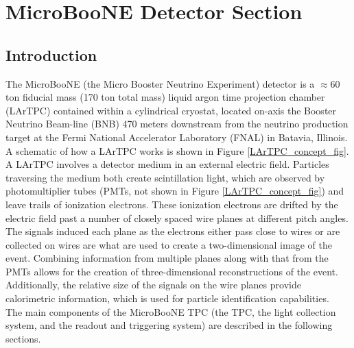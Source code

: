 
\section{MicroBooNE Detector Section}\label{UBDetectorSection}

\subsection{Introduction}
The MicroBooNE (the Micro Booster Neutrino Experiment) detector \cite{UBDetectorPaper} is a $\approx$60 ton fiducial mass (170 ton total mass) liquid argon time projection chamber (LArTPC) contained within a cylindrical cryostat, located on-axis the Booster Neutrino Beam-line (BNB) 470 meters downstream from the neutrino production target at the Fermi National Accelerator Laboratory (FNAL) in Batavia, Illinois. A schematic of how a LArTPC works is shown in Figure \ref{LArTPC_concept_fig}. A LArTPC involves a detector medium in an external electric field. Particles traversing the medium both create scintillation light, which are observed by photomultiplier tubes (PMTs, not shown in Figure \ref{LArTPC_concept_fig}) and leave trails of ionization electrons. These ionization electrons are drifted by the electric field past a number of closely spaced wire planes at different pitch angles. The signals induced each plane as the electrons either pass close to wires or are collected on wires are what are used to create a two-dimensional image of the event. Combining information from multiple planes along with that from the PMTs allows for the creation of three-dimensional reconstructions of the event. Additionally, the relative size of the signals on the wire planes provide calorimetric information, which is used for particle identification capabilities.\\

The main components of the MicroBooNE TPC (the TPC, the light collection system, and the readout and triggering system) are described in the following sections.

